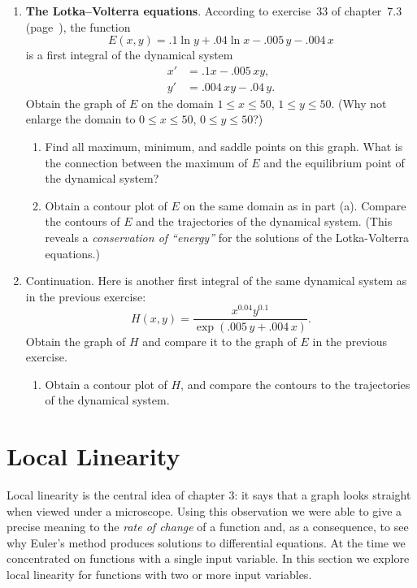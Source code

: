 \begin{enumerate}
\begin{enumerate}
\end{enumerate}
\item {\bf The Lotka--Volterra equations}. According to exercise~33 of chapter~7.3
(page~\pageref{L-V first int}), the function
\[
E(x, y) = .1 \ln{y} + .04 \ln{x} - .005 \, y -.004 \, x
\]
is a first integral of the dynamical system
\begin{align*}
x' &= .1 x - .005 \, xy,	\\
y' &= .004 \, xy - .04 \, y.
\end{align*}
Obtain the graph of $E$ on the domain $1\leq x \leq 50$, $1 \leq y
\leq 50$.  (Why not enlarge the domain to $0 \leq x \leq 50$, $0 \leq
y \leq 50$?)


  \begin{enumerate}
  \item Find all maximum, minimum, and saddle points on this graph.  What
is the connection between the maximum of $E$ and the equilibrium point
of the dynamical system?

  \item Obtain a contour plot of $E$ on the same domain as in part (a).
Compare the contours of $E$ and the trajectories of the dynamical
system.  (This reveals a {\em conservation of ``energy''\/} for the
solutions of the Lotka-Volterra equations.)


\end{enumerate}
\item Continuation.  Here is another first integral of the same
dynamical system as in the previous exercise:
\[
H(x, y) = \dfrac{x^{0.04} y^{0.1}}{\exp(.005 \, y + .004 \, x)}.
\]
Obtain the graph of $H$ and compare it to the graph of $E$ in the
previous exercise.

  \begin{enumerate}
  \item Obtain a contour plot of $H$, and compare the contours to the
trajectories of the dynamical system.



\end{enumerate}
\end{enumerate}
\section{Local Linearity}
\label{sec:local-linearity}

Local linearity is the central idea of chapter 3: it says that a graph
looks straight when viewed under a microscope. Using
this observation we were able to give a precise meaning to the {\em
  rate of change\/} of a function and, as a consequence, to see why
Euler's method produces solutions to differential equations.  At the
time we concentrated on functions with a single input variable.  In
this section we explore local linearity for functions with two or more
input variables.

